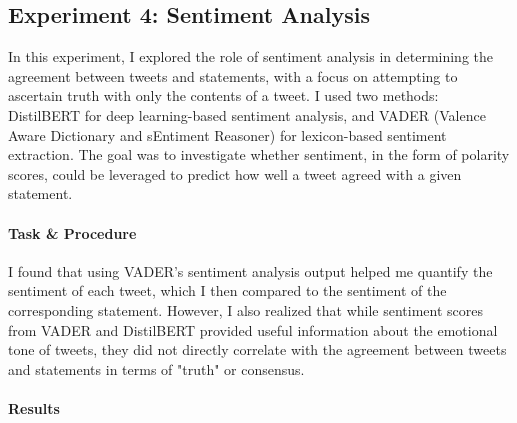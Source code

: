 \documentclass[14]{article}
\begin{document}
\subsection{Experiment 4: Sentiment Analysis}

In this experiment, I explored the role of sentiment analysis in determining the agreement between tweets and statements, with a focus on attempting to ascertain truth with only the contents of a tweet. I used two methods: DistilBERT \cite{distilbert} for deep learning-based sentiment analysis, and VADER (Valence Aware Dictionary and sEntiment Reasoner) \cite{vader} for lexicon-based sentiment extraction. The goal was to investigate whether sentiment, in the form of polarity scores, could be leveraged to predict how well a tweet agreed with a given statement.

\paragraph{Task \& Procedure}

I found that using VADER's \cite{vader} sentiment analysis output helped me quantify the sentiment of each tweet, which I then compared to the sentiment of the corresponding statement. However, I also realized that while sentiment scores from VADER and DistilBERT \cite{distilbert} provided useful information about the emotional tone of tweets, they did not directly correlate with the agreement between tweets and statements in terms of "truth" or consensus.

\paragraph{Results}

\begin{table}[h!]
\centering
{}
\caption{Sentiment Analysis Classification Report}
\end{table}
\end{document}
